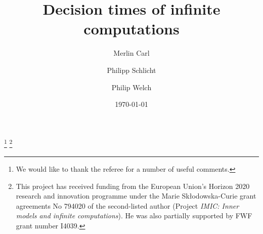 \documentclass[a4paper,11pt]{amsart}
\theoremstyle{definition}
\newtheorem*{problem A}{Problem 1}
\newtheorem*{problem B}{Problem 2}
\theoremstyle{remark}
\begin{document}




\author{Merlin Carl}
\address{Europa-Universit\"at Flensburg, 
Institut f\"ur mathematische, naturwissenschaftliche und technische Bildung
Abteilung f\"ur Mathmematik und ihre Didaktik
Geb\"aude Riga 1, 
Auf dem Campus 1b, 
24943 Flensburg} 
\urladdr{}


\author{Philipp Schlicht}
\address{School of Mathematics, University of Bristol, Fry Building, Woodland Road, Bristol, BS8 1UG, UK
and 
Institute for Mathematics, University of Vienna, Kolingasse 14-16, 1090 Vienna, Austria} 



\author{Philip Welch}
\address{School of Mathematics, University of Bristol, Fry Building, Woodland Road, Bristol, BS8 1UG, UK} 


\thanks{We would like to thank the referee for a number of useful comments.} 
\thanks{This project has received funding from the European Union's Horizon 2020 research and innovation programme under the Marie Sk{\l}odowska-Curie grant agreements No 794020 of the second-listed author (Project \emph{IMIC: Inner models and infinite computations}). He was also partially supported by FWF grant number I4039.} 






\title{Decision times of infinite computations} 
\date{\today}
\end{document}
